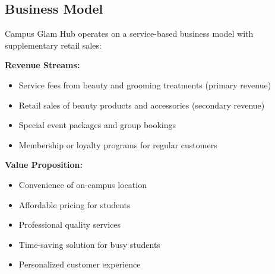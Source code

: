 \subsection{Business Model}

Campus Glam Hub operates on a service-based business model with supplementary retail sales:

\textbf{Revenue Streams:}
\begin{itemize}[leftmargin=2em]
    \item Service fees from beauty and grooming treatments (primary revenue)
    \item Retail sales of beauty products and accessories (secondary revenue)
    \item Special event packages and group bookings
    \item Membership or loyalty programs for regular customers
\end{itemize}

\textbf{Value Proposition:}
\begin{itemize}[leftmargin=2em]
    \item Convenience of on-campus location
    \item Affordable pricing for students
    \item Professional quality services
    \item Time-saving solution for busy students
    \item Personalized customer experience
\end{itemize}

\vspace{1em}

